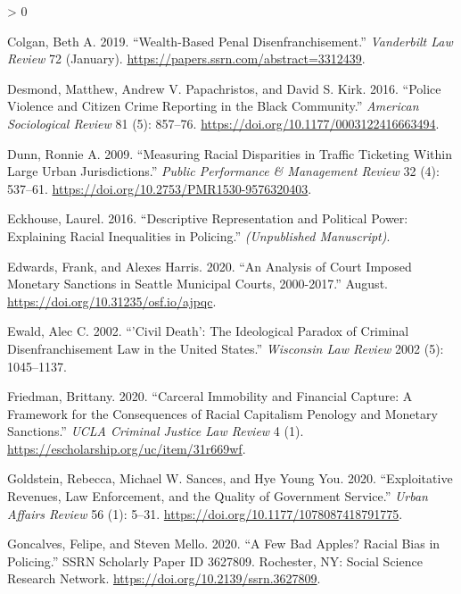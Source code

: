 \documentclass[
  12pt,
]{article}
\newlength{\cslhangindent}
\newenvironment{CSLReferences}[2] %
 {%
  \setlength{\parindent}{0pt}
  \ifodd #1 \everypar{\setlength{\hangindent}{\cslhangindent}}\ignorespaces\fi
  \ifnum #2 > 0
  \setlength{\parskip}{#2\baselineskip}
  \fi
 }%
 {}
\begin{document}
\begin{CSLReferences}{1}{0}
\leavevmode\hypertarget{ref-Colgan2019}{}%
Colgan, Beth A. 2019. {``Wealth-{Based Penal Disenfranchisement}.''} \emph{Vanderbilt Law Review} 72 (January). \url{https://papers.ssrn.com/abstract=3312439}.

\leavevmode\hypertarget{ref-Desmond2016}{}%
Desmond, Matthew, Andrew V. Papachristos, and David S. Kirk. 2016. {``Police {Violence} and {Citizen Crime Reporting} in the {Black Community}.''} \emph{American Sociological Review} 81 (5): 857--76. \url{https://doi.org/10.1177/0003122416663494}.

\leavevmode\hypertarget{ref-Dunn2009}{}%
Dunn, Ronnie A. 2009. {``Measuring {Racial Disparities} in {Traffic Ticketing Within Large Urban Jurisdictions}.''} \emph{Public Performance \& Management Review} 32 (4): 537--61. \url{https://doi.org/10.2753/PMR1530-9576320403}.

\leavevmode\hypertarget{ref-Eckhouse2016}{}%
Eckhouse, Laurel. 2016. {``Descriptive {Representation} and {Political Power}: {Explaining Racial Inequalities} in {Policing}.''} \emph{(Unpublished Manuscript)}.

\leavevmode\hypertarget{ref-Edwards2020}{}%
Edwards, Frank, and Alexes Harris. 2020. {``An {Analysis} of {Court Imposed Monetary Sanctions} in {Seattle Municipal Courts}, 2000-2017.''} August. \url{https://doi.org/10.31235/osf.io/ajpqc}.

\leavevmode\hypertarget{ref-Ewald2002}{}%
Ewald, Alec C. 2002. {``'{Civil} Death': {The} Ideological Paradox of Criminal Disenfranchisement Law in the {United States}.''} \emph{Wisconsin Law Review} 2002 (5): 1045--1137.

\leavevmode\hypertarget{ref-Friedman2020}{}%
Friedman, Brittany. 2020. {``Carceral {Immobility} and {Financial Capture}: {A Framework} for the {Consequences} of {Racial Capitalism Penology} and {Monetary Sanctions}.''} \emph{UCLA Criminal Justice Law Review} 4 (1). \url{https://escholarship.org/uc/item/31r669wf}.

\leavevmode\hypertarget{ref-Goldstein2020}{}%
Goldstein, Rebecca, Michael W. Sances, and Hye Young You. 2020. {``Exploitative {Revenues}, {Law Enforcement}, and the {Quality} of {Government Service}.''} \emph{Urban Affairs Review} 56 (1): 5--31. \url{https://doi.org/10.1177/1078087418791775}.

\leavevmode\hypertarget{ref-Goncalves2020}{}%
Goncalves, Felipe, and Steven Mello. 2020. {``A {Few Bad Apples}? {Racial Bias} in {Policing}.''} SSRN Scholarly Paper ID 3627809. {Rochester, NY}: {Social Science Research Network}. \url{https://doi.org/10.2139/ssrn.3627809}.


\end{CSLReferences}
\end{document}
